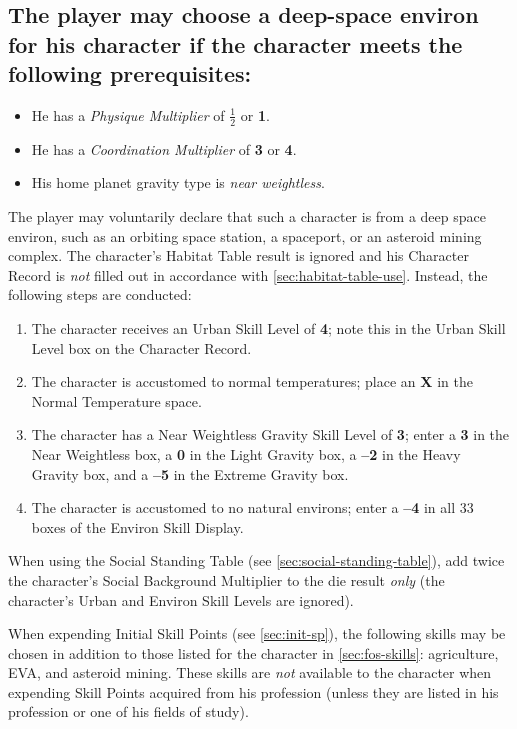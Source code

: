 \subsection[Deep-Space Environs]{The player may choose a deep-space
  environ for his character if the character meets the following
  prerequisites:}
\label{sec:deep-space}

\begin{itemize}
\item He has a \emph{Physique Multiplier} of \textbf{$\frac12$} or
  \textbf{1}. 
\item He has a \emph{Coordination Multiplier} of \textbf{3} or
  \textbf{4}.
\item His home planet gravity type is \emph{near weightless}.
\end{itemize}

The player may voluntarily declare that such a character is from a
deep space environ, such as an orbiting space station, a spaceport,
or an asteroid mining complex. The character's Habitat Table result is
ignored and his Character Record is \emph{not} filled out in accordance with
\ref{sec:habitat-table-use}. Instead, the following steps are
conducted:

\begin{enumerate}
\item The character receives an Urban Skill Level of \textbf{4}; note this in
  the Urban Skill Level box on the Character Record.
\item The character is accustomed to normal temperatures; place an
  \textbf{\textsf{X}} in the Normal Temperature space.
\item The character has a Near Weightless Gravity Skill Level of
  \textbf{3}; enter a \textbf{3} in the Near Weightless box, a
  \textbf{0} in the Light Gravity box, a \textbf{--2} in the Heavy
  Gravity box, and a \textbf{--5} in the Extreme Gravity box.
\item The character is accustomed to no natural environs; enter a
  \textbf{--4} in all 33 boxes of the Environ Skill Display.
\end{enumerate}

When using the Social Standing Table (see
\ref{sec:social-standing-table}), add twice the character's Social
Background Multiplier to the die result \emph{only} (the character's
Urban and Environ Skill Levels are ignored).

When expending Initial Skill Points (see \ref{sec:init-sp}), the
following skills may be chosen in addition to those listed for the
character in \ref{sec:fos-skills}: agriculture, EVA, and asteroid
mining. These skills are \emph{not} available to the character when
expending Skill Points acquired from his profession (unless they are
listed in his profession or one of his fields of study).


